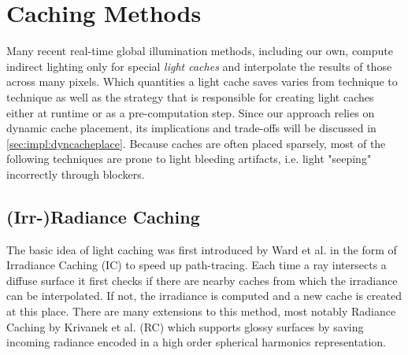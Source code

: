 \documentclass[thesis.tex]{subfiles}
\begin{document}
\section{Caching Methods}
Many recent real-time global illumination methods, including our own, compute indirect lighting only for special \emph{light caches} and interpolate the results of those across many pixels.
Which quantities a light cache saves varies from technique to technique as well as the strategy that is responsible for creating light caches either at runtime or as a pre-computation step.
Since our approach relies on dynamic cache placement, its implications and trade-offs will be discussed in \autoref{sec:impl:dyncacheplace}.
Because caches are often placed sparsely, most of the following techniques are prone to light bleeding artifacts, i.e. light "seeping" incorrectly through blockers.

\subsection{(Irr-)Radiance Caching}
The basic idea of light caching was first introduced by Ward et al. \cite{bib:irradiancecaching} in the form of Irradiance Caching (IC) to speed up path-tracing.
Each time a ray intersects a diffuse surface it first checks if there are nearby caches from which the irradiance can be interpolated.
If not, the irradiance is computed and a new cache is created at this place.
There are many extensions to this method, most notably Radiance Caching by Krivanek et al. \cite{bib:radiancecaching} (RC) which supports glossy surfaces by saving incoming radiance encoded in a high order spherical harmonics representation.
\end{document}

